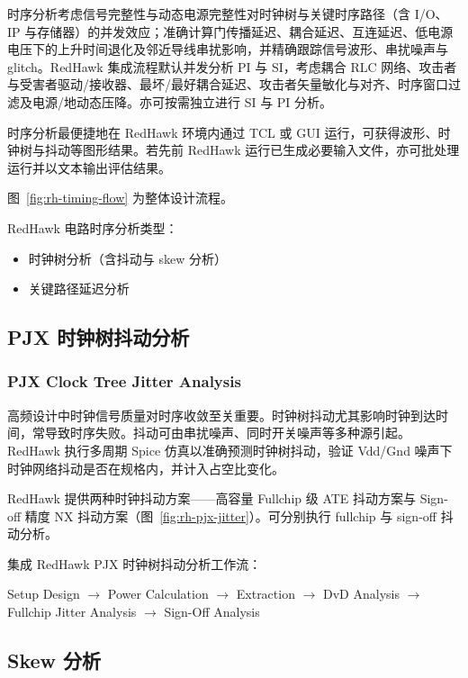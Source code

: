 时序分析考虑信号完整性与动态电源完整性对时钟树与关键时序路径（含 I/O、IP 与存储器）的并发效应；准确计算门传播延迟、耦合延迟、互连延迟、低电源电压下的上升时间退化及邻近导线串扰影响，并精确跟踪信号波形、串扰噪声与 glitch。RedHawk 集成流程默认并发分析 PI 与 SI，考虑耦合 RLC 网络、攻击者与受害者驱动/接收器、最坏/最好耦合延迟、攻击者矢量敏化与对齐、时序窗口过滤及电源/地动态压降。亦可按需独立进行 SI 与 PI 分析。

时序分析最便捷地在 RedHawk 环境内通过 TCL 或 GUI 运行，可获得波形、时钟树与抖动等图形结果。若先前 RedHawk 运行已生成必要输入文件，亦可批处理运行并以文本输出评估结果。

图~\ref{fig:rh-timing-flow} 为整体设计流程。

\label{fig:rh-timing-flow}

RedHawk 电路时序分析类型：
\begin{itemize}
  \item 时钟树分析（含抖动与 skew 分析）
  \item 关键路径延迟分析
\end{itemize}

\subsection{PJX 时钟树抖动分析}
\subsubsection*{PJX Clock Tree Jitter Analysis}

高频设计中时钟信号质量对时序收敛至关重要。时钟树抖动尤其影响时钟到达时间，常导致时序失败。抖动可由串扰噪声、同时开关噪声等多种源引起。RedHawk 执行多周期 Spice 仿真以准确预测时钟树抖动，验证 Vdd/Gnd 噪声下时钟网络抖动是否在规格内，并计入占空比变化。

RedHawk 提供两种时钟抖动方案——高容量 Fullchip 级 ATE 抖动方案与 Sign-off 精度 NX 抖动方案（图~\ref{fig:rh-pjx-jitter}）。可分别执行 fullchip 与 sign-off 抖动分析。


集成 RedHawk PJX 时钟树抖动分析工作流：
\begin{center}
Setup Design $\rightarrow$ Power Calculation $\rightarrow$ Extraction $\rightarrow$ DvD Analysis $\rightarrow$ Fullchip Jitter Analysis $\rightarrow$ Sign-Off Analysis
\end{center}

\subsection{Skew 分析}

